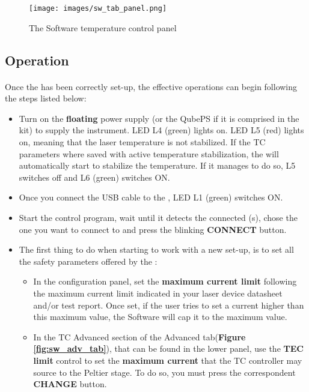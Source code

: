     \begin{figure}[h]
        \centering
        \texttt{[image: images/sw\_tab\_panel.png]}
        \caption{The \SoftwareType Software temperature control panel}
        \label{fig:sw_temp_ctrl_panel}
    \end{figure}





\subsection{Operation}  \label{Operation_chapter}
\paragraph{} Once the \QubeModel  has been correctly set-up, the effective operations can begin following the steps listed below:
\begin{itemize}
    \item Turn on the \textbf{floating} power supply (or the QubePS if it is comprised in the kit) to supply the instrument.
    \newline LED L4 (green) lights on.
    \newline LED L5 (red) lights on, meaning that the laser temperature is not stabilized. If the TC parameters where saved with active temperature stabilization, the \QubeModel  will automatically start to stabilize the temperature. If it manages to do so, L5 switches off and L6 (green) switches ON.
    
    \item Once you connect the USB cable to the \QubeModel , LED L1 (green) switches ON.
   
    \item Start the \QubeModel \textunderscore control program, wait until it detects the connected \QubeModel (s), chose the one you want to connect to and press the blinking \textbf{CONNECT} button.
    
    \item The first thing to do when starting to work with a new set-up, is to set all the safety parameters offered by the \QubeModel :
    \begin{itemize}
        \item In the configuration panel, set the \textbf{maximum current limit} following the maximum current limit indicated in your laser device datasheet and/or test report. Once set, if the user tries to set a current higher than this maximum value, the \SoftwareType Software will cap it to the maximum value.
        \item In the TC Advanced section of the Advanced tab(\textbf{Figure \ref{fig:sw_adv_tab}}), that can be found in the lower panel, use the \textbf{TEC limit} control to set the \textbf{maximum current} that the TC controller may source to the Peltier stage. To do so, you must press the correspondent \textbf{CHANGE} button.
    \end{itemize}
\end{itemize}

